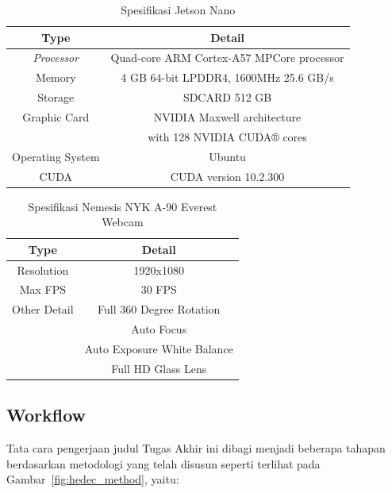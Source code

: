 \begin{table} [ht]
  \caption{Spesifikasi Jetson Nano}
  \label{tab:jetsonspec}
  \centering
  \begin{tabular}{|c|c|}
    \hline
    \textbf{Type} & \textbf{Detail}  \\
    \hline
    \textit{Processor} & Quad-core ARM Cortex-A57 MPCore processor \\ 
    Memory             & 4 GB 64-bit LPDDR4, 1600MHz 25.6 GB/s  \\
    Storage            & SDCARD 512 GB\\
    Graphic Card       & NVIDIA Maxwell architecture \\
                      & with 128 NVIDIA CUDA® cores \\
    Operating System   & Ubuntu     \\
    CUDA               & CUDA version 10.2.300    \\              
    \hline
  \end{tabular}
\end{table}

\begin{table} [ht]
  \caption{Spesifikasi Nemesis NYK A-90 Everest Webcam}
  \label{tab:nyka90_webcam_spec}
  \centering
  \begin{tabular}{|c|c|}
    \hline
    \textbf{Type} & \textbf{Detail}  \\
    \hline
    Resolution         & 1920x1080 \\ 
    Max FPS            & 30 FPS  \\
    Other Detail       & Full 360 Degree Rotation \\
                        & Auto Focus \\
                        & Auto Exposure White Balance    \\
                      & Full HD Glass Lens    \\              
    \hline
  \end{tabular}
\end{table}

\subsection{Workflow}
\label{subsec:workflow}

\par Tata cara pengerjaan judul Tugas Akhir ini dibagi menjadi beberapa tahapan berdasarkan metodologi yang telah disusun seperti terlihat pada Gambar~\ref{fig:hedec_method}, yaitu:

